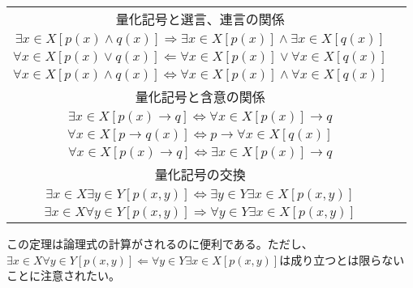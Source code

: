 \documentclass[a4paper]{jsarticle}
\begin{document}
\begin{thm}
\begin{longtable}[c]{|c|c|}
\hline
量化記号と選言、連言の関係 & \hspace{-0.5em}\begin{tabular}{c}
  $\exists x \in X\left[ p(x) \vee q(x) \right] \Leftrightarrow \exists x \in X\left[ p(x) \right] \vee \exists x \in X\left[ q(x) \right] $ \\
  $\exists x \in X\left[ p(x) \land q(x) \right] \Rightarrow \exists x \in X\left[ p(x) \right] \land \exists x \in X\left[ q(x) \right] $ \\
  $\forall x \in X\left[ p(x) \vee q(x) \right] \Leftarrow \forall x \in X\left[ p(x) \right] \vee \forall x \in X\left[ q(x) \right] $ \\
  $\forall x \in X\left[ p(x) \land q(x) \right] \Leftrightarrow \forall x \in X\left[ p(x) \right] \land \forall x \in X\left[ q(x) \right] $ 
\end{tabular}\\
\hline
量化記号と含意の関係 & \hspace{-0.5em}\begin{tabular}{c}
  $\exists x \in X\left[ p \rightarrow q(x) \right] \Leftrightarrow p \rightarrow \exists x \in X\left[ q(x) \right] $ \\
  $\exists x \in X\left[ p(x) \rightarrow q \right] \Leftrightarrow \forall x \in X\left[ p(x) \right] \rightarrow q $ \\
  $\forall x \in X\left[ p \rightarrow q(x) \right] \Leftrightarrow p \rightarrow \forall x \in X\left[ q(x) \right] $ \\
  $\forall x \in X\left[ p(x) \rightarrow q \right] \Leftrightarrow \exists x \in X\left[ p(x) \right] \rightarrow q$ 
\end{tabular}\\
\hline
量化記号の交換 & \hspace{-0.5em}\begin{tabular}{c}
  $\forall x \in X\forall y \in Y\left[ p(x,y) \right] \Leftrightarrow \forall y \in Y\forall x \in X\left[ p(x,y) \right] $ \\
  $\exists x \in X\exists y \in Y\left[ p(x,y) \right] \Leftrightarrow \exists y \in Y\exists x \in X\left[ p(x,y) \right] $ \\
  $\exists x \in X\forall y \in Y\left[ p(x,y) \right] \Rightarrow \forall y \in Y\exists x \in X\left[ p(x,y) \right] $ 
\end{tabular}\\
\hline
\end{longtable}
\end{thm}
この定理は論理式の計算がされるのに便利である。ただし、$\exists x \in X\forall y \in Y\left[ p(x,y) \right] \Leftarrow \forall y \in Y\exists x \in X\left[ p(x,y) \right]$は成り立つとは限らないことに注意されたい。
\end{document}
